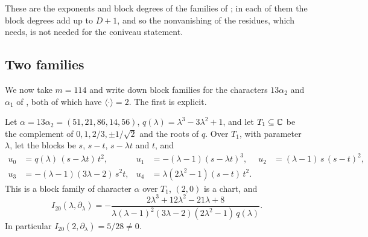 These are the exponents and block degrees of the families of
;
in each of them the block degrees add up to $D+1$, and so the
nonvanishing of the residues, which  needs, is not
needed for the coniveau statement.

\subsection{Two families}\label{ssec:twofamilies}
We now take $m=114$ and write down block families for the characters
$13\alpha_{2}$ and $\alpha_{1}$ of , both of which have
$\langle\cdot\rangle=2$. The first is explicit.

\begin{proposition}\label{prop:family1}
Let $\alpha=13\alpha_{2}=(51,21,86,14,56)$, $q(\lambda)=\lambda^{3}-
3\lambda^{2}+1$, and let $T_{1}\subseteq\mathbb{C}$ be the complement of
$0,1,2/3,\pm1/\sqrt2$ and the roots of $q$. Over $T_{1}$, with parameter
$\lambda$, let the blocks be $s$, $s-t$, $s-\lambda t$ and $t$, and
\begin{align*}
  u_{0}&=q(\lambda)\,(s-\lambda t)\,t^{2}, & u_{1}&=-(\lambda-1)(s-\lambda
  t)^{3}, & u_{2}&=(\lambda-1)\,s\,(s-t)^{2},\\
  u_{3}&=-(\lambda-1)(3\lambda-2)\,s^{2}t, & u_{4}&=\lambda(2\lambda^{2}-1)
  (s-t)\,t^{2}.
\end{align*}
This is a block family of character $\alpha$ over $T_{1}$, $(2,0)$ is a
chart, and
\[
  I_{20}(\lambda,\partial_{\lambda})=-\frac{2\lambda^{3}+12\lambda^{2}
  -21\lambda+8}{\lambda(\lambda-1)^{2}(3\lambda-2)(2\lambda^{2}-1)\,
  q(\lambda)}.
\]
In particular $I_{20}(2,\partial_{\lambda})=5/28\ne0$.
\end{proposition}

